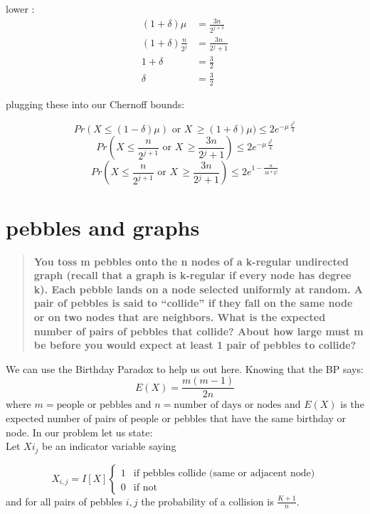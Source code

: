 \documentclass[titlepage]{article}\usepackage[]{graphicx}\usepackage[]{color}
\begin{document}
lower :
\begin{align*}
	(1+\delta)\mu &= \frac{3n}{2^{j+1}} \\
	(1+\delta)\frac{n}{2^j} &= \frac{3n}{2{^j+1}} \\
	1+\delta &= \frac{3}{2} \\
	\delta &= \frac{3}{2}
\end{align*}

plugging these into our Chernoff bounds:

	\[ Pr(X \leq (1 - \delta)\mu)  \text{ or }  X \, \geq (1 + \delta)\mu) \leq 2e^{−\mu \, \frac{\delta^2}{4}} \]
	\[ Pr\left(X \leq \frac{n}{2^{j+1}} \text{ or }  X \, \geq \frac{3n}{2{^j+1}} \right)  \leq 2e^{−\mu \, \frac{\delta^2}{4}} \]
	\[ Pr\left(X \leq \frac{n}{2^{j+1}} \text{ or }  X \, \geq \frac{3n}{2{^j+1}} \right)  \leq 2e^{1-\frac{n}{16*2^j}} \]





\section{pebbles and graphs}

\begin{quote}
	\textbf{You toss m pebbles onto the n nodes of a k-regular undirected graph (recall
		that a graph is k-regular if every node has degree k). Each pebble lands on
		a node selected uniformly at random. A pair of pebbles is said to ``collide''
		if they fall on the same node or on two nodes that are neighbors. What is
		the expected number of pairs of pebbles that collide? About how large must
	m be before you would expect at least 1 pair of pebbles to collide?}
\end{quote}

We can use the Birthday Paradox to help us out here. Knowing that the BP says:
\[ E(X) = \frac{m(m-1)}{2n} \]
where $m = \text{people or pebbles}$ and $n = \text{number of days or nodes}$
and $E(X)$ is the expected number of pairs of people or pebbles that have the
same birthday or node. In our problem let us state:\\

Let $X{i_j}$ be an indicator variable saying 

\[
	X_{i,j} = I[X]
	\begin{cases}
		1 & \text{if pebbles collide (same or adjacent node)} \\
		0 & \text{if not } 
	\end{cases}
\]
and for all pairs of pebbles $i,j$ the probability of a collision is
$\frac{K+1}{n}$.
\end{document}
